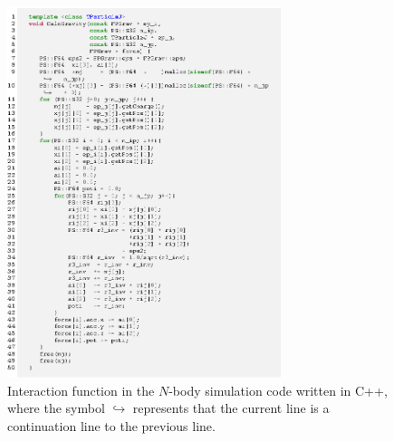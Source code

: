 \documentclass[twocolumn,useamsfonts]{pasj01}
\begin{document}
\begin{figure}[h]
\begin{center}
\includegraphics[width=8cm]{figures/src_cpp_nbody_kernel}
\end{center}
\caption{Interaction function in the $N$-body simulation code written in C++, where the symbol $\hookrightarrow$ represents that the current line is a continuation line to the previous line.}
\label{fig:src_cpp_nbody_kernel}  
\end{figure}
\end{document}
